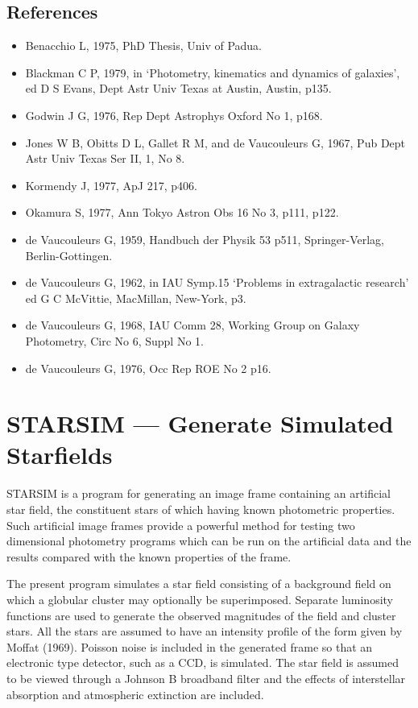 \subsection {References}
\begin{itemize}
\item Benacchio L, 1975, PhD Thesis, Univ of Padua.
\item Blackman C P, 1979, in `Photometry, kinematics and dynamics of galaxies',
ed D S Evans, Dept Astr Univ Texas at Austin, Austin, p135.
\item Godwin J G, 1976, Rep Dept Astrophys Oxford No 1, p168.
\item Jones W B, Obitts D L, Gallet R M, and de Vaucouleurs G, 1967, Pub Dept
Astr Univ Texas Ser II, 1, No 8.
\item Kormendy J, 1977, ApJ 217, p406.
\item Okamura S, 1977, Ann Tokyo Astron Obs 16 No 3, p111, p122.
\item de Vaucouleurs G, 1959, Handbuch der Physik 53 p511, Springer-Verlag,
Berlin-Gottingen.
\item de Vaucouleurs G, 1962, in IAU Symp.15 `Problems in extragalactic
research' ed G C McVittie, MacMillan, New-York, p3.
\item de Vaucouleurs G, 1968, IAU Comm 28, Working Group on Galaxy Photometry,
Circ No 6, Suppl No 1.
\item de Vaucouleurs G, 1976, Occ Rep ROE No 2 p16.
\end{itemize}

\section {STARSIM --- Generate Simulated Starfields}

STARSIM is a program for generating an image frame containing an artificial
star field, the constituent stars of which having known photometric properties.
Such artificial image frames provide a powerful method for testing two
dimensional photometry programs which can be run on the artificial data and the
results compared with the known properties of the frame.

The present program simulates a star field consisting of a background field on
which a globular cluster may optionally be superimposed.
Separate luminosity functions are used to generate the observed magnitudes of
the field and cluster stars.
All the stars are assumed to have an intensity profile of the form given by
Moffat (1969).
Poisson noise is included in the generated frame so that an electronic type
detector, such as a CCD, is simulated.
The star field is assumed to be viewed through a Johnson B broadband filter and
the effects of interstellar absorption and atmospheric extinction are included.
